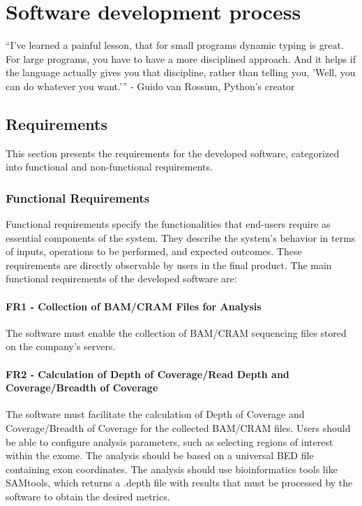 \chapter{Software development process}
\label{chapter:Analysis tool}

\begin{introduction}
    “I've learned a painful lesson, that for small programs dynamic typing is great. For large programs, you have to have a more disciplined approach. And it helps if the language actually gives you that discipline, rather than telling you, 'Well, you can do whatever you want.'” - Guido van Rossum, Python's creator
\end{introduction}

\section{Requirements}

This section presents the requirements for the developed software, categorized into functional and non-functional requirements. 
\subsection{Functional Requirements}

Functional requirements specify the functionalities that end-users require as essential components of the system. They describe the system's behavior in terms of inputs, operations to be performed, and expected outcomes. These requirements are directly observable by users in the final product. \cite{Geeks2024} The main functional requirements of the developed software are:

\subsubsection{\textbf{FR1 - Collection of BAM/CRAM Files for Analysis}}

The software must enable the collection of BAM/CRAM sequencing files stored on the company's servers.

\subsubsection{\textbf{FR2 - Calculation of Depth of Coverage/Read Depth and Coverage/Breadth of Coverage}}

The software must facilitate the calculation of Depth of Coverage and Coverage/Breadth of Coverage for the collected BAM/CRAM files. Users should be able to configure analysis parameters, such as selecting regions of interest within the exome. The analysis should be based on a universal BED file containing exon coordinates. The analysis should use bioinformatics tools like SAMtools, which returns a .depth file with results that must be processed by the software to obtain the desired metrics.

